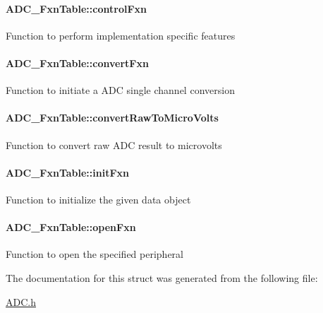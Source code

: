 \paragraph[{control\+Fxn}]{ A\+D\+C\+\_\+\+Fxn\+Table\+::control\+Fxn}\label{struct_a_d_c___fxn_table_af92f7867301c8edd125436ca66e16877}
Function to perform implementation specific features 
\paragraph[{convert\+Fxn}]{ A\+D\+C\+\_\+\+Fxn\+Table\+::convert\+Fxn}\label{struct_a_d_c___fxn_table_ac7255105d1eca815a45714ff0d2186cd}
Function to initiate a A\+D\+C single channel conversion 
\paragraph[{convert\+Raw\+To\+Micro\+Volts}]{ A\+D\+C\+\_\+\+Fxn\+Table\+::convert\+Raw\+To\+Micro\+Volts}\label{struct_a_d_c___fxn_table_a9f99de002ca85c6aae274dd4c23de61a}
Function to convert raw A\+D\+C result to microvolts 
\paragraph[{init\+Fxn}]{ A\+D\+C\+\_\+\+Fxn\+Table\+::init\+Fxn}\label{struct_a_d_c___fxn_table_a5b2882d28b0e4a8c8d7bb2ed741380e8}
Function to initialize the given data object 
\paragraph[{open\+Fxn}]{ A\+D\+C\+\_\+\+Fxn\+Table\+::open\+Fxn}\label{struct_a_d_c___fxn_table_aa74579528b7be192281bf5c23e6dcf03}
Function to open the specified peripheral 

The documentation for this struct was generated from the following file\+:\begin{DoxyCompactItemize}
\item 
\hyperlink{_a_d_c_8h}{A\+D\+C.\+h}\end{DoxyCompactItemize}
